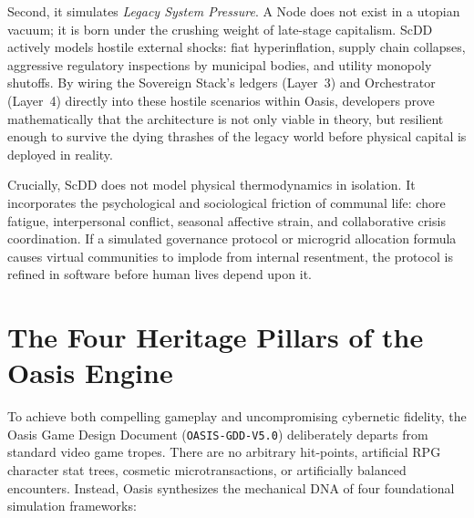 Second, it simulates \textit{Legacy System Pressure}. A Node does not exist in a utopian vacuum; it is born under the crushing weight of late-stage capitalism. ScDD actively models hostile external shocks: fiat hyperinflation, supply chain collapses, aggressive regulatory inspections by municipal bodies, and utility monopoly shutoffs. By wiring the Sovereign Stack's ledgers (Layer~3) and Orchestrator (Layer~4) directly into these hostile scenarios within Oasis, developers prove mathematically that the architecture is not only viable in theory, but resilient enough to survive the dying thrashes of the legacy world before physical capital is deployed in reality.

Crucially, ScDD does not model physical thermodynamics in isolation. It incorporates the psychological and sociological friction of communal life: chore fatigue, interpersonal conflict, seasonal affective strain, and collaborative crisis coordination. If a simulated governance protocol or microgrid allocation formula causes virtual communities to implode from internal resentment, the protocol is refined in software before human lives depend upon it.


\section{The Four Heritage Pillars of the Oasis Engine}
\label{sec:oasis-heritage}

To achieve both compelling gameplay and uncompromising cybernetic fidelity, the Oasis Game Design Document (\texttt{OASIS-GDD-V5.0}) deliberately departs from standard video game tropes. There are no arbitrary hit-points, artificial RPG character stat trees, cosmetic microtransactions, or artificially balanced encounters. Instead, Oasis synthesizes the mechanical DNA of four foundational simulation frameworks:


